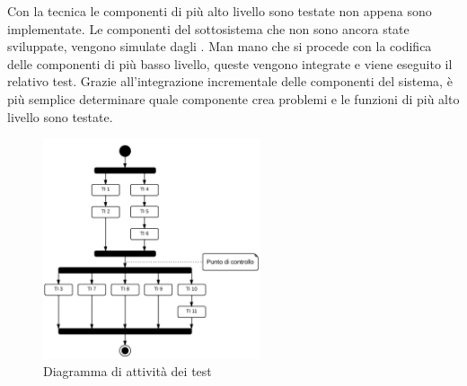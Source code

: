 	Con la tecnica  le componenti di più alto livello sono testate non appena sono implementate. Le componenti del sottosistema che non sono ancora state sviluppate, vengono simulate dagli . Man mano che si procede con la codifica delle componenti di più basso livello, queste vengono integrate e viene eseguito il relativo test. Grazie all'integrazione incrementale delle componenti del sistema, è più semplice determinare quale componente crea problemi e le funzioni di più alto livello sono testate.

	\begin{figure}[H]
	\centering \includegraphics[width=0.57\textwidth]{sequenza-dei-test.png}
	\caption{Diagramma di attività dei test}
	\label{fig:sequenza-dei-test}
	\end{figure}
	
